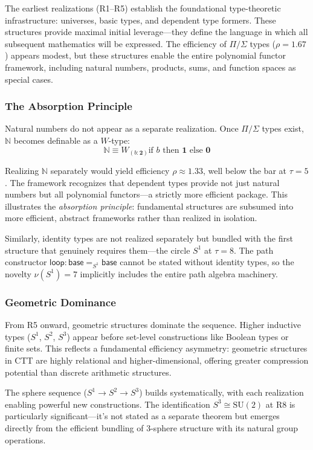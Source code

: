 \documentclass[11pt]{article}
\theoremstyle{definition}
\theoremstyle{plain}
\theoremstyle{remark}
\begin{document}
The earliest realizations (R1--R5) establish the foundational type-theoretic infrastructure: universes, basic types, and dependent type formers. These structures provide maximal initial leverage—they define the language in which all subsequent mathematics will be expressed. The efficiency of $\Pi/\Sigma$ types ($\rho = 1.67$) appears modest, but these structures enable the entire polynomial functor framework, including natural numbers, products, sums, and function spaces as special cases.

\subsubsection{The Absorption Principle}

Natural numbers do not appear as a separate realization. Once $\Pi/\Sigma$ types exist, $\mathbb{N}$ becomes definable as a $W$-type:
\[
\mathbb{N} \equiv W_{(b:\mathbf{2})} \text{if } b \text{ then } \mathbf{1} \text{ else } \mathbf{0}
\]

Realizing $\mathbb{N}$ separately would yield efficiency $\rho \approx 1.33$, well below the bar at $\tau = 5$. The framework recognizes that dependent types provide not just natural numbers but all polynomial functors—a strictly more efficient package. This illustrates the \emph{absorption principle}: fundamental structures are subsumed into more efficient, abstract frameworks rather than realized in isolation.

Similarly, identity types are not realized separately but bundled with the first structure that genuinely requires them—the circle $S^1$ at $\tau = 8$. The path constructor $\mathsf{loop} : \mathsf{base} =_{S^1} \mathsf{base}$ cannot be stated without identity types, so the novelty $\nu(S^1) = 7$ implicitly includes the entire path algebra machinery.

\subsubsection{Geometric Dominance}

From R5 onward, geometric structures dominate the sequence. Higher inductive types ($S^1$, $S^2$, $S^3$) appear before set-level constructions like Boolean types or finite sets. This reflects a fundamental efficiency asymmetry: geometric structures in CTT are highly relational and higher-dimensional, offering greater compression potential than discrete arithmetic structures.

The sphere sequence ($S^1 \to S^2 \to S^3$) builds systematically, with each realization enabling powerful new constructions. The identification $S^3 \cong \mathrm{SU}(2)$ at R8 is particularly significant—it's not stated as a separate theorem but emerges directly from the efficient bundling of 3-sphere structure with its natural group operations.
\end{document}
